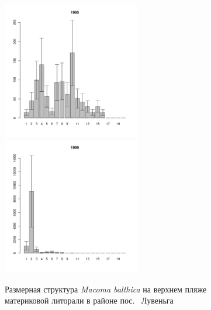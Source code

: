 \begin{figure}[h]
\begin{multicols}{3}
\hfill
\includegraphics[width=60mm]{../White_Sea/Luvenga_II_razrez/high_beatch_1995_.pdf}
\hfill
\includegraphics[width=60mm]{../White_Sea/Luvenga_II_razrez/high_beatch_1999_.pdf}

\end{multicols}


\caption{Размерная структура {\it Macoma balthica} на верхнем пляже материковой литорали в районе пос.~ Лувеньга}
\label{ris:size_str_2razrez_high}
\end{figure}

